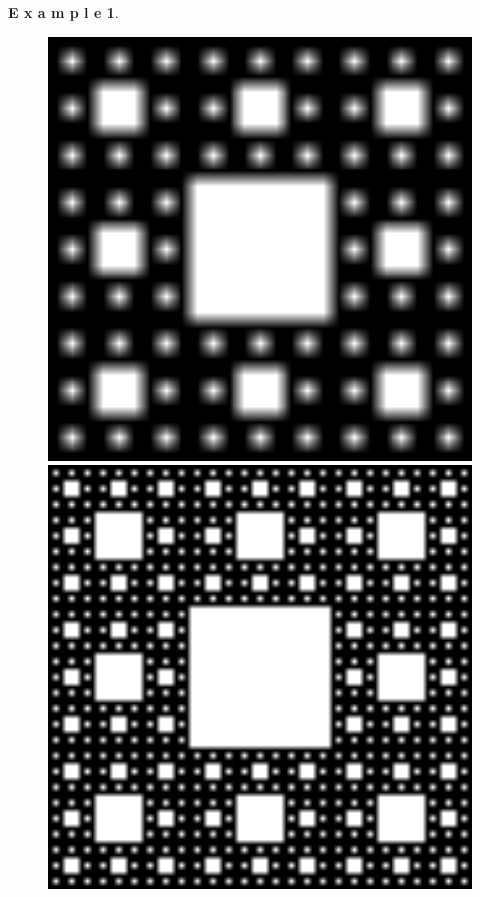 \documentclass[12pt]{article}
\theoremstyle{plain}
\newtheorem{example}{\textbf{E x a m p l e}}[section]
\begin{document}
\begin{example}
\begin{figure}[H]
\begin{minipage}[c][0.15\width]{
   0.15\textwidth}
\end{minipage}
\begin{minipage}[c][0.15\width]{
   0.15\textwidth}
   \centering
   \includegraphics[width=1\textwidth]{figure/section4/carpet3.png}
\end{minipage}
\begin{minipage}[c][0.15\width]{
   0.15\textwidth}
   \centering
   \includegraphics[width=1\textwidth]{figure/section4/carpet4.png}

\end{minipage}
\end{figure}
\end{example}
\end{document}
